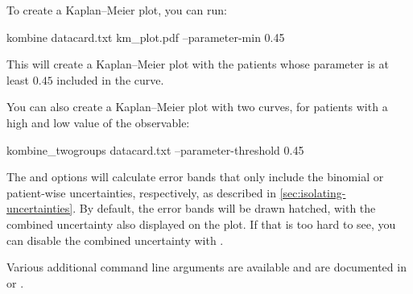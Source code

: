 \documentclass[article]{jss}
\newcommand{\KM}{Kaplan--Meier} %
\begin{document}
To create a \KM{} plot, you can run:
\begin{CodeInput}
kombine datacard.txt km_plot.pdf --parameter-min 0.45
\end{CodeInput}
This will create a \KM{} plot with the patients whose parameter is at least \(0.45\) included in the curve.

You can also create a \KM{} plot with two curves, for patients with a high and low value of the observable:
\begin{CodeInput}
kombine_twogroups datacard.txt --parameter-threshold 0.45
\end{CodeInput}

The  and  options will calculate error bands that only include the binomial or patient-wise uncertainties, respectively, as described in \cref{sec:isolating-uncertainties}. By default, the error bands will be drawn hatched, with the combined uncertainty also displayed on the plot. If that is too hard to see, you can disable the combined uncertainty with .

Various additional command line arguments are available and are documented in  or .
\end{document}
